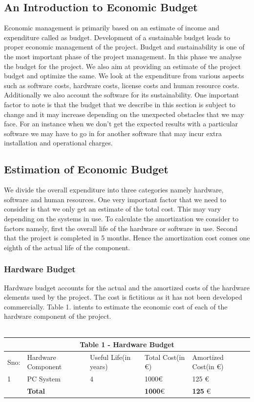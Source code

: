 \subsection{An Introduction to Economic Budget}
Economic management is primarily based on an estimate of income and expenditure called as
budget. Development of a sustainable budget leads to proper economic management of the
project. Budget and sustainability is one of the most important phase of the project
management. In this phase we analyse the budget for the project. We also aim at providing an
estimate of the project budget and optimize the same. We look at the expenditure from various
aspects such as software costs, hardware costs, license costs and human resource costs.
Additionally we also account the software for its sustainability. One important factor to note is
that the budget that we describe in this section is subject to change and it may increase
depending on the unexpected obstacles that we may face. For an instance when we don’t get
the expected results with a particular software we may have to go in for another software that
may incur extra installation and operational charges.
\subsection{Estimation of Economic Budget}
We divide the overall expenditure into three categories namely hardware, software and human
resources. One very important factor that we need to consider is that we only get an estimate
of the total cost. This may vary depending on the systems in use. To calculate the amortization
we consider to factors namely, first the overall life of the hardware or software in use. Second
that the project is completed in 5 months. Hence the amortization cost comes one eighth
of the actual life of the component.\\

\subsubsection{Hardware Budget} Hardware budget accounts for the actual and the amortized costs of the hardware elements
used by the project. The cost is fictitious as it has not been developed commercially. Table 1.
intents to estimate the economic cost of each of the hardware component of the project.
\\\\
\begin{tabular}{|p{1cm}||p{3cm}|p{2cm}|p{3cm}|p{3cm}|}
 \hline
 \multicolumn{5}{|c|}{Table 1 - Hardware Budget} \\
 \hline
 Sno: & Hardware Component&Useful Life(in years) &Total Cost(in \euro) &Amortized Cost(in \euro)\\
 \hline
1   & PC System  &4 &  1000\euro  & 125 \euro \\
\hline
\hline
   & \textbf{Total}  &  &  \textbf{1000}\euro  & \textbf{125} \euro \\
 \hline

\end{tabular}


